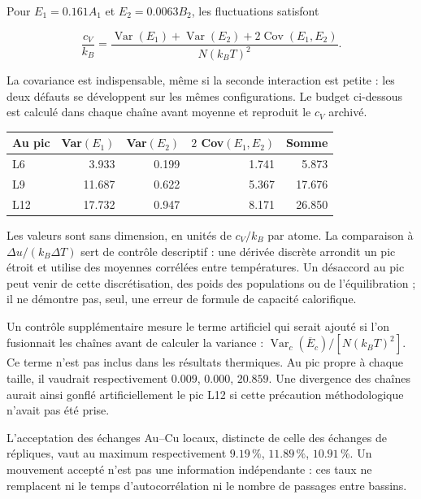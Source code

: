Pour $E_1=0.161A_1$ et $E_2=0.0063B_2$, les fluctuations satisfont

\[\frac{c_V}{k_B}=\frac{\operatorname{Var}(E_1)+\operatorname{Var}(E_2)+2\operatorname{Cov}(E_1,E_2)}{N(k_BT)^2}.\]

La covariance est indispensable, même si la seconde interaction est petite : les deux défauts se développent sur les mêmes configurations. Le budget ci-dessous est calculé dans chaque chaîne avant moyenne et reproduit le $c_V$ archivé.


\begin{center}\small\begin{tabular}{lrrrr}\toprule

Au pic & Var$(E_1)$ & Var$(E_2)$ & $2$ Cov$(E_1,E_2)$ & Somme\\\midrule

L6 & 3.933 & 0.199 & 1.741 & 5.873\\

L9 & 11.687 & 0.622 & 5.367 & 17.676\\

L12 & 17.732 & 0.947 & 8.171 & 26.850\\

\bottomrule\end{tabular}\end{center}

Les valeurs sont sans dimension, en unités de $c_V/k_B$ par atome. La comparaison à $\Delta u/(k_B\Delta T)$ sert de contrôle descriptif : une dérivée discrète arrondit un pic étroit et utilise des moyennes corrélées entre températures. Un désaccord au pic peut venir de cette discrétisation, des poids des populations ou de l’équilibration ; il ne démontre pas, seul, une erreur de formule de capacité calorifique.

Un contrôle supplémentaire mesure le terme artificiel qui serait ajouté si l’on fusionnait les chaînes avant de calculer la variance : $\operatorname{Var}_c(\overline E_c)/[N(k_BT)^2]$. Ce terme n’est pas inclus dans les résultats thermiques. Au pic propre à chaque taille, il vaudrait respectivement $0.009$, $0.000$, $20.859$. Une divergence des chaînes aurait ainsi gonflé artificiellement le pic L12 si cette précaution méthodologique n’avait pas été prise.

L’acceptation des échanges Au--Cu locaux, distincte de celle des échanges de répliques, vaut au maximum respectivement $9.19\,\%$, $11.89\,\%$, $10.91\,\%$. Un mouvement accepté n’est pas une information indépendante : ces taux ne remplacent ni le temps d’autocorrélation ni le nombre de passages entre bassins.

